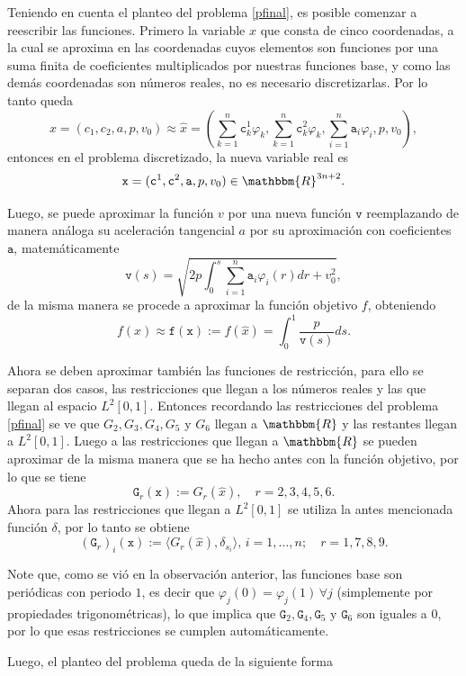 \documentclass[a4paper,10pt]{book}
\newcommand{\R}{\mathbbm{R}}
\begin{document}
Teniendo en cuenta el planteo del problema \eqref{pfinal}, es posible comenzar a reescribir las funciones. Primero la variable $x$ que consta de cinco coordenadas, a la cual se aproxima en las coordenadas cuyos elementos son funciones por una suma finita de coeficientes multiplicados por nuestras funciones base, y como las demás coordenadas son números reales, no es necesario discretizarlas. Por lo tanto queda $$x=(c_1,c_2,a,p,v_0)\approx\hat{x}=\left(\sum_{k=1}^n\texttt{c}^1_k\varphi_k, \sum_{k=1}^n\texttt{c}^2_k\varphi_k,\sum_{i=1}^n\texttt{a}_i\varphi_i, p, v_0\right),$$
entonces en el problema discretizado, la nueva variable real es $$\texttt{x}=(\texttt{c}^1,\texttt{c}^2,\texttt{a},p,v_0)\in\R^{3n+2}.$$

Luego, se puede aproximar la función $v$ por una nueva función $\texttt{v}$ reemplazando de manera análoga su aceleración tangencial $a$ por su aproximación con coeficientes $\texttt{a}$, matemáticamente $$\texttt{v}(s)=\sqrt{2p\int_0^s \sum_{i=1}^n\texttt{a}_i\varphi_i(r)dr +v_0^2},$$
de la misma manera se procede a aproximar la función objetivo $f$, obteniendo $$f(x)\approx\texttt{f}(\texttt{x}):=f(\hat x)=\int_0^1 \frac{p}{\texttt{v}(s)}ds.$$

Ahora se deben aproximar también las funciones de restricción, para ello se separan dos casos, las restricciones que llegan a los números reales y las que llegan al espacio $L^2[0,1]$. Entonces recordando las restricciones del problema \eqref{pfinal} se ve que $G_2, G_3, G_4, G_5$ y $G_6$ llegan a $\R$ y las restantes llegan a $L^2[0,1]$. Luego a las restricciones que llegan a $\R$ se pueden aproximar de la misma manera que se ha hecho antes con la función objetivo, por lo que se tiene $$\texttt{G}_r(\texttt{x}):=G_r(\hat x),\quad r=2,3,4,5,6.$$
Ahora para las restricciones que llegan a $L^2[0,1]$ se utiliza la antes mencionada función $\delta$, por lo tanto se obtiene $$(\texttt{G}_r)_{i}(\texttt{x}):=\langle G_r(\hat x) , \delta_{s_i}\rangle,\,i=1,\ldots,n; \quad r=1,7,8,9.$$

Note que, como se vió en la observación anterior, las funciones base son periódicas con periodo $1$, es decir que $\varphi_j(0)=\varphi_j(1)\, \forall j$ (simplemente por propiedades trigonométricas), lo que implica que $\texttt{G}_2,\texttt{G}_4,\texttt{G}_5\mbox{ y }\texttt{G}_6$ son iguales a 0, por lo que esas restricciones se cumplen automáticamente.

Luego, el planteo del problema queda de la siguiente forma
\end{document}

